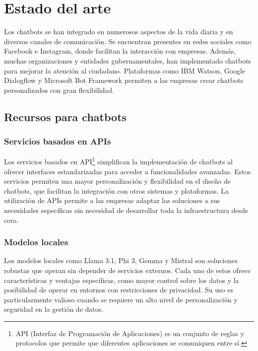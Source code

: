  


 

\section{Estado del arte}

Los chatbots se han integrado en numerosos aspectos de la vida diaria y en diversos canales de comunicación. Se encuentran presentes en redes sociales como Facebook e Instagram, donde facilitan la interacción con empresas. Además, muchas organizaciones y entidades gubernamentales, han implementado chatbots para mejorar la atención al ciudadano. Plataformas como IBM Watson, Google Dialogflow y Microsoft Bot Framework permiten a las empresas crear chatbots personalizados con gran flexibilidad.

\subsection{Recursos para chatbots}

\subsubsection{Servicios basados en APIs}
Los servicios basados en API\footnote{API (Interfaz de Programación de Aplicaciones) es un conjunto de reglas y protocolos que permite que diferentes aplicaciones se comuniquen entre sí.} simplifican la implementación de chatbots al ofrecer interfaces estandarizadas para acceder a funcionalidades avanzadas. Estos servicios permiten una mayor personalización y flexibilidad en el diseño de chatbots, que facilitan la integración con otros sistemas y plataformas. La utilización de APIs permite a las empresas adaptar las soluciones a sus necesidades específicas sin necesidad de desarrollar toda la infraestructura desde cero.


\subsubsection{Modelos locales}
Los modelos locales como Llama 3.1, Phi 3, Gemma y Mistral son soluciones robustas que operan sin depender de servicios externos. Cada uno de estos ofrece características y ventajas específicas, como mayor control sobre los datos y la posibilidad de operar en entornos con restricciones de privacidad. Su uso es particularmente valioso cuando se requiere un alto nivel de personalización y seguridad en la gestión de datos.


